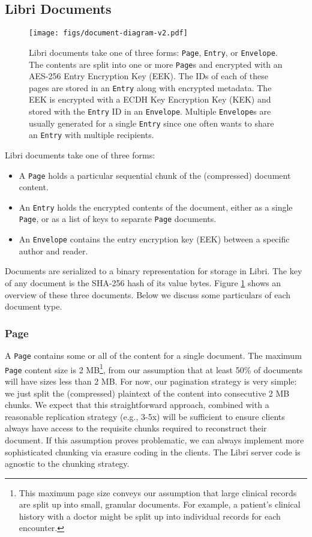 \documentclass[10pt]{article}
\newcommand{\ttt}[1]{\texttt{#1}}
\def\Entry{\ttt{Entry}}
\def\Page{\ttt{Page}}
\def\Envelope{\ttt{Envelope}}
\begin{document}
\subsection{Libri Documents}
\label{sec:Docs}

\begin{figure}[tp]
	\centering
	\texttt{[image: figs/document-diagram-v2.pdf]}
	\caption{Libri documents take one of three forms: \Page{}, \Entry{}, or \Envelope{}. The contents are split into one or more \Page{}s and encrypted with an AES-256 Entry Encryption Key (EEK). The IDs of each of these pages are stored in an \Entry{} along with encrypted metadata. The EEK is encrypted with a ECDH Key Encryption Key (KEK) and stored with the \Entry{} ID in an \Envelope{}. Multiple \Envelope{}s are usually generated for a single \Entry{} since one often wants to share an \Entry{} with multiple recipients.}
	\label{fig:documents}
\end{figure}


Libri documents take one of three forms:
\begin{itemize}
	\item A \Page{} holds a particular sequential chunk of the (compressed) document content. 
	\item An \Entry{} holds the encrypted contents of the document, either as a single \Page{}, or as a list of keys to separate \Page{} documents.
	\item An \Envelope{} contains the entry encryption key (EEK) between a specific author and reader.
\end{itemize}
Documents are serialized to a binary representation for storage in Libri. The key of any document is the SHA-256 hash of its value bytes. Figure \ref{fig:documents} shows an overview of these three documents. Below we discuss some particulars of each document type. 

\subsubsection{Page}
A \Page{} contains some or all of the content for a single document. The maximum \Page {} content size is 2 MB\footnote{This maximum page size conveys our assumption that large clinical records are split up into small, granular documents. For example, a patient's clinical history with a doctor might be split up into individual records for each encounter.}, from our assumption that at least 50\% of documents will have sizes less than 2 MB. For now, our pagination strategy is very simple: we just split the (compressed) plaintext of the content into consecutive 2 MB chunks. We expect that this straightforward approach, combined with a reasonable replication strategy (e.g., 3-5x) will be sufficient to ensure clients always have access to the requisite chunks required to reconstruct their document. If this assumption proves problematic, we can always implement more sophisticated chunking via erasure coding in the clients. The Libri server code is agnostic to the chunking strategy.
\end{document}
